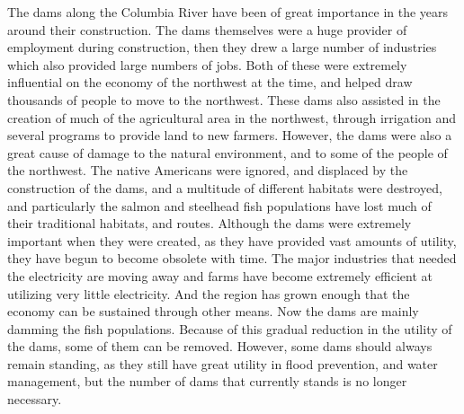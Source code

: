 \documentclass[12pt,twoside]{article}
\begin{document}
The dams along the Columbia River have been of great importance in the years around their construction. The dams themselves were a huge provider of employment during construction, then they drew a large number of industries which also provided large numbers of jobs. Both of these were extremely influential on the economy of the northwest at the time, and helped draw thousands of people to move to the northwest. These dams also assisted in the creation of much of the agricultural area in the northwest, through irrigation and several programs to provide land to new farmers. However, the dams were also a great cause of damage to the natural environment, and to some of the people of the northwest. The native Americans were ignored, and displaced by the construction of the dams, and a multitude of different habitats were destroyed, and particularly the salmon and steelhead fish populations have lost much of their traditional habitats, and routes. Although the dams were extremely important when they were created, as they have provided vast amounts of utility, they have begun to become obsolete with time. The major industries that needed the electricity are moving away and farms have become extremely efficient at utilizing very little electricity. And the region has grown enough that the economy can be sustained through other means. Now the dams are mainly damming the fish populations. Because of this gradual reduction in the utility of the dams, some of them can be removed. However, some dams should always remain standing, as they still have great utility in flood prevention, and water management, but the number of dams that currently stands is no longer necessary.
\newpage
\printbibliography{}
\end{document}
